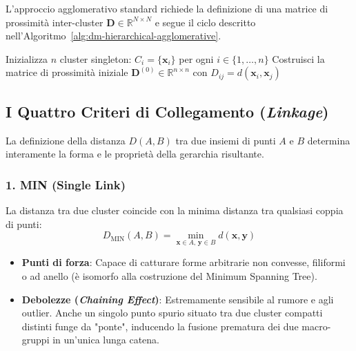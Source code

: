 L'approccio agglomerativo standard richiede la definizione di una matrice di prossimità inter-cluster $\mathbf{D} \in \mathbb{R}^{N \times N}$ e segue il ciclo descritto nell'Algoritmo~\ref{alg:dm-hierarchical-agglomerative}.

\begin{algorithm}[htbp]
\SetAlgoLined
{}
Inizializza $n$ cluster singleton: $C_i = \{\mathbf{x}_i\}$ per ogni $i \in \{1, \dots, n\}$\;
Costruisci la matrice di prossimità iniziale $\mathbf{D}^{(0)} \in \mathbb{R}^{n \times n}$ con $D_{ij} = d(\mathbf{x}_i, \mathbf{x}_j)$\;
\caption{Algoritmo gerarchico agglomerativo standard.}
\label{alg:dm-hierarchical-agglomerative}
\end{algorithm}

\subsection{I Quattro Criteri di Collegamento (\textit{Linkage})}

La definizione della distanza $D(A, B)$ tra due insiemi di punti $A$ e $B$ determina interamente la forma e le proprietà della gerarchia risultante.

\subsubsection{1. MIN (Single Link)}
La distanza tra due cluster coincide con la minima distanza tra qualsiasi coppia di punti:
\begin{equation}
    D_{\text{MIN}}(A, B) = \min_{\mathbf{x} \in A, \, \mathbf{y} \in B} d(\mathbf{x}, \mathbf{y})
    \label{eq:dm-single-link}
\end{equation}
\begin{itemize}[noitemsep]
    \item \textbf{Punti di forza}: Capace di catturare forme arbitrarie non convesse, filiformi o ad anello (è isomorfo alla costruzione del Minimum Spanning Tree).
    \item \textbf{Debolezze (\textit{Chaining Effect})}: Estremamente sensibile al rumore e agli outlier. Anche un singolo punto spurio situato tra due cluster compatti distinti funge da "ponte", inducendo la fusione prematura dei due macro-gruppi in un'unica lunga catena.
\end{itemize}

